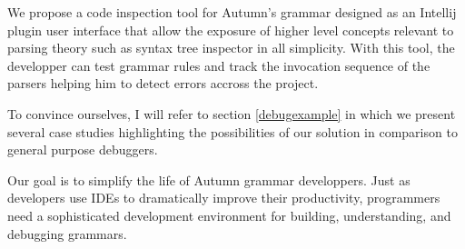 \bigskip


We propose a code inspection tool for Autumn's grammar designed as an Intellij plugin user interface that allow the exposure of higher level concepts relevant to parsing theory such as syntax tree inspector in all simplicity. With this tool, the developper can test grammar rules and track the invocation sequence of the parsers helping him to detect errors accross the project.

To convince ourselves, I will refer to section \ref{debugexample} in which we present several case studies highlighting the possibilities of our solution in comparison to general purpose debuggers.

\bigskip

Our goal is to simplify the life of Autumn grammar developpers. Just as developers use IDEs to dramatically improve their productivity, programmers need a sophisticated development environment for building, understanding, and debugging grammars. 

	\begin{comment}


Despite their importance, most debuggers only provide low-level operations that do not capture user intent and standard user interfaces that only display generic information. These issues can be addressed if developers are able to create domain-specific debuggers adapted to their problems and domains. Domain- specific debuggers can provide features at a higher level of abstraction that (i) match the domain model of software applications and (ii) group contextual information from various sources.

Consider a framework for synchronous message passing. One common use case in applications using it is the delivery of a message to a list of subscribers. When debugging this use case, a developer might need to step to when the current message is delivered to the next subscriber. One solution is to manually
step through the execution until the desired code location is reached. Another consists in identifying the code location beforehand, setting a breakpoint there and resuming execution. In both cases developers have to manually perform a series of actions each time they want to execute this high-level operation.

The lack of a debugger at the proper abstraction level limits an end-user‟s ability to discover and locate faults in a DSL program.

	\end{comment}



